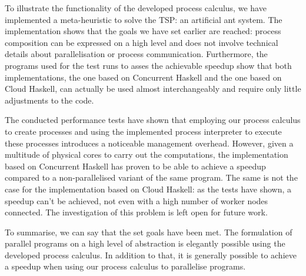 To illustrate the functionality of the developed process calculus, we have implemented a meta-heuristic to solve the \textsc{TSP}: an artificial ant system. The implementation shows that the goals we have set earlier are reached: process composition can be expressed on a high level and does not involve technical details about parallelisation or process communication. Furthermore, the programs used for the test runs to asses the achievable speedup show that both implementations, the one based on \textsf{Concurrent Haskell} and the one based on \textsf{Cloud Haskell}, can actually be used almost interchangeably and require only little adjustments to the code.

The conducted performance tests have shown that employing our process calculus to create processes and using the implemented process interpreter to execute these processes introduces a noticeable management overhead. However, given a multitude of physical cores to carry out the computations, the implementation based on \textsf{Concurrent Haskell} has proven to be able to achieve a speedup compared to a non-parallelised variant of the same program. The same is not the case for the implementation based on \textsf{Cloud Haskell}: as the tests have shown, a speedup can't be achieved, not even with a high number of worker nodes connected. The investigation of this problem is left open for future work.

To summarise, we can say that the set goals have been met. The formulation of parallel programs on a high level of abstraction is elegantly possible using the developed process calculus. In addition to that, it is generally possible to achieve a speedup when using our process calculus to parallelise programs.